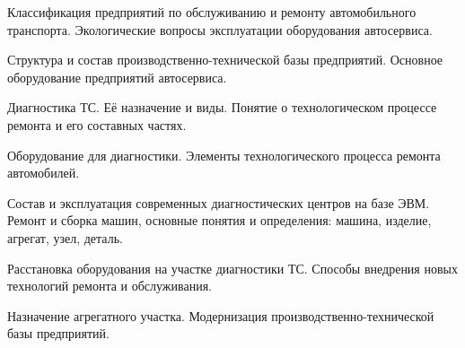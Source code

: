 \documentclass[
	14pt,
	a4paper,
	]
	{scrartcl}
\begin{document}
\shapk
{}
\setcounter{zad}{0}

\vfill
\z Классификация предприятий по обслуживанию и ремонту автомобильного транспорта.
 \vfill
\z Экологические вопросы эксплуатации оборудования автосервиса. \vfill

\vfill

\newpage


\shapk
{}
\setcounter{zad}{0}

\vfill
\z Структура и состав производственно-технической базы предприятий.
 \vfill
\z Основное оборудование предприятий автосервиса.
 \vfill

\vfill

\newpage


\shapk
{}
\setcounter{zad}{0}

\vfill
\z Диагностика ТС. Её назначение и виды.
 \vfill
\z Понятие о технологическом процессе ремонта и его составных частях.
 \vfill

\vfill

\newpage


\shapk
{}
\setcounter{zad}{0}

\vfill
\z Оборудование для диагностики.
 \vfill
\z Элементы технологического процесса ремонта автомобилей.
 \vfill

\vfill

\newpage


\shapk
{}
\setcounter{zad}{0}

\vfill
\z Состав и эксплуатация современных диагностических центров на базе ЭВМ.
 \vfill
\z Ремонт и сборка машин, основные понятия и определения: машина, изделие, агрегат, узел, деталь.
 \vfill

\vfill

\newpage


\shapk
{}
\setcounter{zad}{0}

\vfill
\z Расстановка оборудования на участке диагностики ТС. 
 \vfill
\z Способы внедрения новых технологий ремонта и обслуживания.
 \vfill

\vfill

\newpage


\shapk
{}
\setcounter{zad}{0}

\vfill
\z Назначение агрегатного участка.
 \vfill
\z Модернизация производственно-технической базы предприятий.
 \vfill

\vfill
\end{document}
